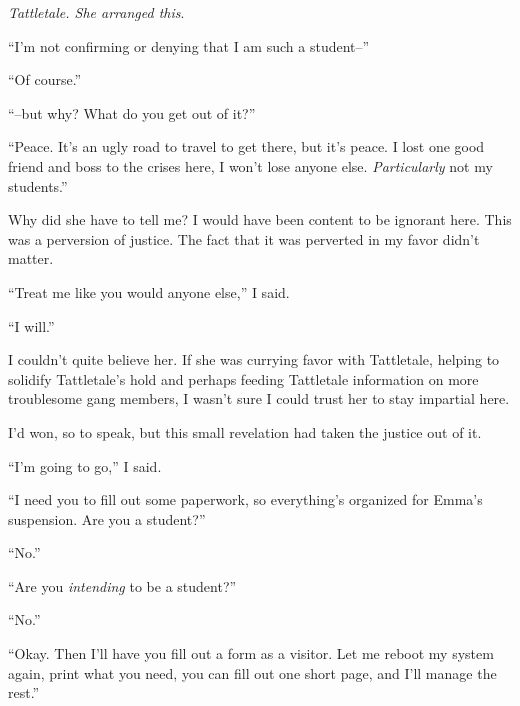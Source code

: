 \emph{Tattletale.  She arranged this}.



``I'm not confirming or denying that I am such a student--''



``Of course.''



``--but why?  What do you get out of it?''



``Peace.  It's an ugly road to travel to get there, but it's peace.  I lost one good friend and boss to the crises here, I won't lose anyone else.  \emph{Particularly} not my students.''



Why did she have to tell me?  I would have been content to be ignorant here.  This was a perversion of justice.  The fact that it was perverted in my favor didn't matter.



``Treat me like you would anyone else,'' I said.



``I will.''



I couldn't quite believe her.  If she was currying favor with Tattletale, helping to solidify Tattletale's hold and perhaps feeding Tattletale information on more troublesome gang members, I wasn't sure I could trust her to stay impartial here.



I'd won, so to speak, but this small revelation had taken the justice out of it.



``I'm going to go,'' I said.



``I need you to fill out some paperwork, so everything's organized for Emma's suspension.  Are you a student?''



``No.''



``Are you \emph{intending} to be a student?''



``No.''



``Okay.  Then I'll have you fill out a form as a visitor.  Let me reboot my system again, print what you need, you can fill out one short page, and I'll manage the rest.''



